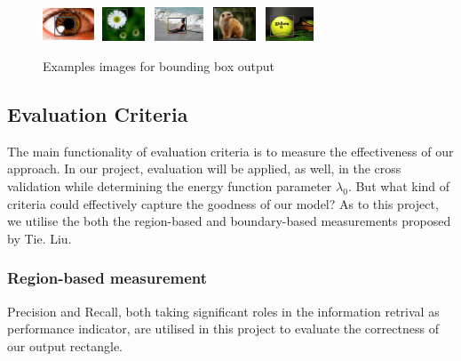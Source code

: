 \documentclass[10pt,twocolumn,letterpaper]{article}
\begin{document}
\begin{figure}[h]
\begin{center}
    \includegraphics[width=0.6in,height=0.4in]{./Figures/boundingbox/5_155_155096RECT.jpg}
    \includegraphics[width=0.6in,height=0.4in]{./Figures/boundingbox/5_155_155145RECT.jpg}
    \includegraphics[width=0.6in,height=0.4in]{./Figures/boundingbox/5_155_155333RECT.jpg}
    \includegraphics[width=0.6in,height=0.4in]{./Figures/boundingbox/5_155_155196RECT.jpg}
    \includegraphics[width=0.6in,height=0.4in]{./Figures/boundingbox/5_155_155459RECT.jpg} \\
    \caption{Examples images for bounding box output}
\end{center}
\end{figure}


\subsection{Evaluation Criteria}
The main functionality of evaluation criteria is to measure the effectiveness of our approach.
In our project, evaluation will be applied, as well, in the cross validation while determining the 
energy function parameter $\lambda_0$. 
But what kind of criteria could effectively capture the goodness of our model?
As to this project, we utilise the both the region-based and boundary-based measurements proposed by Tie. Liu.

\subsubsection{Region-based measurement}
Precision and Recall, both taking significant roles in the information retrival as performance indicator,
are utilised in this project to evaluate the correctness of our output rectangle. 
\end{document}
